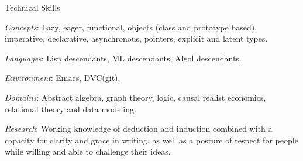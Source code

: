 \begin{rubric}{Technical Skills}{


  \entry* \emph{Concepts}: Lazy, eager, functional, objects (class and
prototype based), imperative, declarative, asynchronous, pointers,
explicit and latent types.

  \entry* \emph{Languages}: Lisp descendants, ML descendants, Algol
descendants.

  \entry* \emph{Environment}: Emacs, DVC(git).

  \entry* \emph{Domains}: Abstract algebra, graph theory, logic,
causal realist economics, relational theory and data modeling.

  \entry* \emph{Research}: Working knowledge of deduction and
induction combined with a capacity for clarity and grace in writing,
as well as a posture of respect for people while willing and able to
challenge their ideas.

}\end{rubric}
